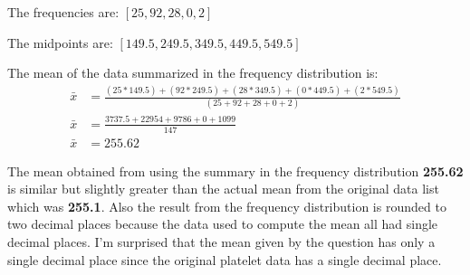 \documentclass[12pt,fleqn]{article}
\begin{document}
The frequencies are: $[25, 92, 28, 0, 2]$

The midpoints are: $[149.5, 249.5, 349.5, 449.5, 549.5]$

The mean of the data summarized in the frequency distribution is:
\begin{align}
  \bar{x} &= \frac{(25* 149.5) + (92 * 249.5) + (28 * 349.5) + (0 * 449.5) + (2 * 549.5)}{(25 + 92 + 28 + 0 + 2)} \\
  \bar{x} &= \frac{3737.5 + 22954 + 9786 + 0 + 1099}{147} \\
  \bar{x} &= 255.62
\end{align}

The mean obtained from using the summary in the frequency distribution \textbf{255.62} is similar but slightly greater than the actual mean from the original data list which was \textbf{255.1}. Also the result from the frequency distribution is rounded to two decimal places because the data used to compute the mean all had single decimal places. I'm surprised that the mean given by the question has only a single decimal place since the original platelet data has a single decimal place.
\end{document}
